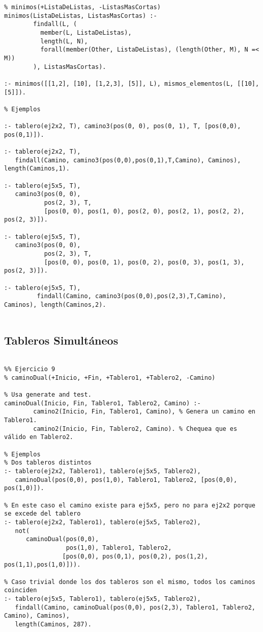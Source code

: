 \begin{verbatim}
% minimos(+ListaDeListas, -ListasMasCortas)
minimos(ListaDeListas, ListasMasCortas) :-
        findall(L, (
          member(L, ListaDeListas),
          length(L, N),
          forall(member(Other, ListaDeListas), (length(Other, M), N =< M))
        ), ListasMasCortas).

:- minimos([[1,2], [10], [1,2,3], [5]], L), mismos_elementos(L, [[10], [5]]).

% Ejemplos

:- tablero(ej2x2, T), camino3(pos(0, 0), pos(0, 1), T, [pos(0,0), pos(0,1)]).

:- tablero(ej2x2, T), 
   findall(Camino, camino3(pos(0,0),pos(0,1),T,Camino), Caminos), length(Caminos,1).

:- tablero(ej5x5, T), 
   camino3(pos(0, 0), 
           pos(2, 3), T, 
           [pos(0, 0), pos(1, 0), pos(2, 0), pos(2, 1), pos(2, 2), pos(2, 3)]).

:- tablero(ej5x5, T), 
   camino3(pos(0, 0), 
           pos(2, 3), T, 
           [pos(0, 0), pos(0, 1), pos(0, 2), pos(0, 3), pos(1, 3), pos(2, 3)]).

:- tablero(ej5x5, T), 
         findall(Camino, camino3(pos(0,0),pos(2,3),T,Camino), Caminos), length(Caminos,2).


\end{verbatim}


\subsection{Tableros Simultáneos}

\begin{verbatim}

%% Ejercicio 9
% caminoDual(+Inicio, +Fin, +Tablero1, +Tablero2, -Camino)

% Usa generate and test.
caminoDual(Inicio, Fin, Tablero1, Tablero2, Camino) :-
        camino2(Inicio, Fin, Tablero1, Camino), % Genera un camino en Tablero1.
        camino2(Inicio, Fin, Tablero2, Camino). % Chequea que es válido en Tablero2.

% Ejemplos
% Dos tableros distintos
:- tablero(ej2x2, Tablero1), tablero(ej5x5, Tablero2), 
   caminoDual(pos(0,0), pos(1,0), Tablero1, Tablero2, [pos(0,0), pos(1,0)]).

% En este caso el camino existe para ej5x5, pero no para ej2x2 porque se excede del tablero
:- tablero(ej2x2, Tablero1), tablero(ej5x5, Tablero2), 
   not(
      caminoDual(pos(0,0), 
                 pos(1,0), Tablero1, Tablero2, 
                [pos(0,0), pos(0,1), pos(0,2), pos(1,2), pos(1,1),pos(1,0)])).

% Caso trivial donde los dos tableros son el mismo, todos los caminos coinciden
:- tablero(ej5x5, Tablero1), tablero(ej5x5, Tablero2), 
   findall(Camino, caminoDual(pos(0,0), pos(2,3), Tablero1, Tablero2, Camino), Caminos), 
   length(Caminos, 287).

\end{verbatim}

